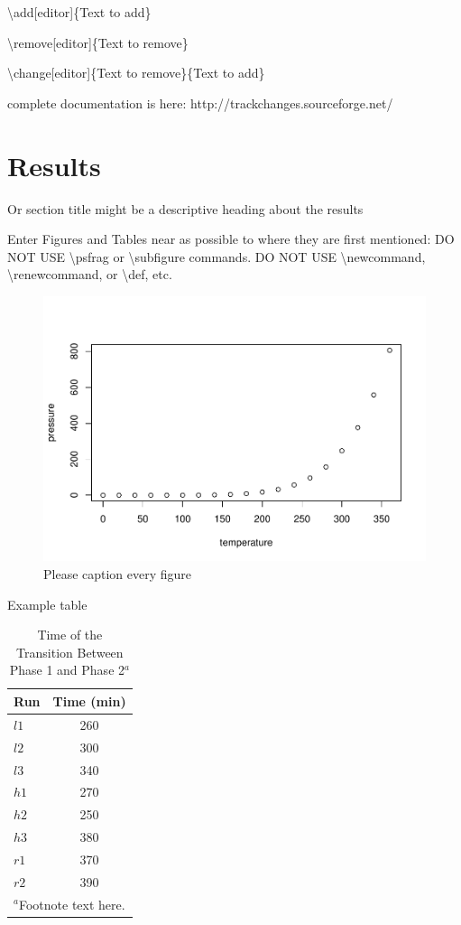 \documentclass[draft,linenumbers]{agujournal2018}
\begin{document}
\textbackslash{}add{[}editor{]}\{Text to add\}

\textbackslash{}remove{[}editor{]}\{Text to remove\}

\textbackslash{}change{[}editor{]}\{Text to remove\}\{Text to add\}

complete documentation is here: http://trackchanges.sourceforge.net/

\section{Results}

Or section title might be a descriptive heading about the results

Enter Figures and Tables near as possible to where they are first
mentioned: DO NOT USE \textbackslash{}psfrag or
\textbackslash{}subfigure commands. DO NOT USE
\textbackslash{}newcommand, \textbackslash{}renewcommand, or
\textbackslash{}def, etc.

\begin{figure}[h]
\includegraphics{StreamFluxArticle_files/figure-latex/unnamed-chunk-2-1} \caption{Please caption every figure}\label{fig:unnamed-chunk-2}
\end{figure}

Example table

\begin{table}
 \caption{Time of the Transition Between Phase 1 and Phase 2$^{a}$}
 \centering
 \begin{tabular}{l c}
 \hline
  Run  & Time (min)  \\
 \hline
   $l1$  & 260   \\
   $l2$  & 300   \\
   $l3$  & 340   \\
   $h1$  & 270   \\
   $h2$  & 250   \\
   $h3$  & 380   \\
   $r1$  & 370   \\
   $r2$  & 390   \\
 \hline
 \multicolumn{2}{l}{$^{a}$Footnote text here.}
 \end{tabular}
 \end{table}
\end{document}
